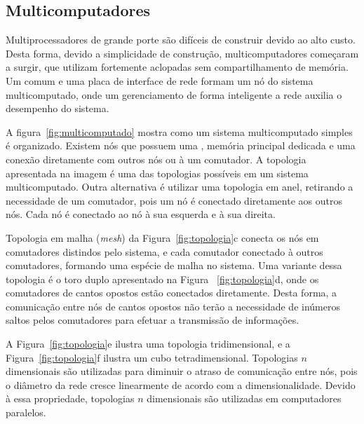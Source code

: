 \subsection{Multicomputadores}





Multiprocessadores de grande porte são difíceis de construir devido ao alto
custo. Desta forma, devido a simplicidade de construção, multicomputadores
começaram a surgir, que utilizam \cpus fortemente aclopadas sem compartilhamento
de memória. Um \pc comum e uma placa de interface de rede formam um nó do
sistema multicomputado, onde um gerenciamento de forma inteligente a rede auxilia o desempenho
do sistema.

A figura~\ref{fig:multicomputado} mostra como um sistema multicomputado simples é
organizado. Existem nós que possuem uma \cpu, memória principal dedicada e uma
conexão diretamente com outros nós ou à um comutador. A topologia apresentada na
imagem é uma das topologias possíveis em um sistema multicomputado. Outra
alternativa é utilizar uma topologia em anel, retirando a necessidade de um
comutador, pois um nó é conectado diretamente aos outros nós. Cada nó é
conectado ao nó à sua esquerda e à sua direita.

Topologia em malha (\textit{mesh}) da Figura~\ref{fig:topologia}c conecta os nós
em comutadores distindos pelo sistema, e cada comutador conectado à outros
comutadores, formando uma espécie de malha no sistema. Uma variante dessa
topologia é o toro duplo apresentado na Figura ~\ref{fig:topologia}d, onde os
comutadores de cantos opostos estão conectados diretamente. Desta forma, a
comunicação entre nós de cantos opostos não terão a necessidade de inúmeros
saltos pelos comutadores para efetuar a transmissão de informações.

A Figura~\ref{fig:topologia}e ilustra uma topologia tridimensional, e a
Figura~\ref{fig:topologia}f ilustra um cubo tetradimensional. Topologias
$n$ dimensionais são utilizadas para diminuir o atraso de comunicação entre nós,
pois o diâmetro da rede cresce linearmente de acordo com a dimensionalidade.
Devido à essa propriedade, topologias $n$ dimensionais são utilizadas em
computadores paralelos.

